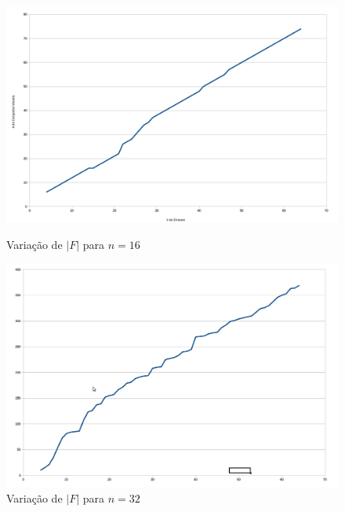\begin{figure}[ht] 
  \label{fig:tamanho} 
  \begin{minipage}[b]{0.5\linewidth}
    \centering
    \includegraphics[width=1\linewidth]{figs/tamanho16.png} 
    \caption{Variação de $|F|$ para $n=16$} 
    \vspace{4ex}
  \end{minipage}%
  \begin{minipage}[b]{0.5\linewidth}
    \centering
    \includegraphics[width=1\linewidth]{figs/tamanho32.png} 
    \caption{Variação de $|F|$ para $n=32$} 
    \vspace{4ex}
  \end{minipage} 
  \begin{minipage}[b]{0.5\linewidth}
    \centering

\end{minipage}
\end{figure}
